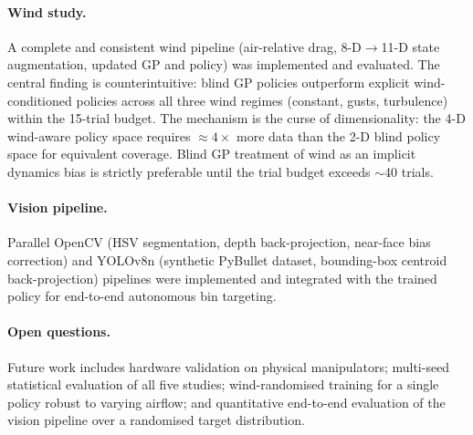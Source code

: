 \paragraph{Wind study.}
A complete and consistent wind pipeline (air-relative drag, 8-D$\to$11-D state
augmentation, updated GP and policy) was implemented and evaluated.
The central finding is counterintuitive: blind GP policies outperform explicit
wind-conditioned policies across all three wind regimes (constant, gusts, turbulence)
within the 15-trial budget.
The mechanism is the curse of dimensionality: the 4-D wind-aware policy space requires
$\approx 4\times$ more data than the 2-D blind policy space for equivalent coverage.
Blind GP treatment of wind as an implicit dynamics bias is strictly preferable until
the trial budget exceeds $\sim$40 trials.

\paragraph{Vision pipeline.}
Parallel OpenCV (HSV segmentation, depth back-projection, near-face bias correction)
and YOLOv8n (synthetic PyBullet dataset, bounding-box centroid back-projection)
pipelines were implemented and integrated with the trained policy for end-to-end
autonomous bin targeting.

\paragraph{Open questions.}
Future work includes hardware validation on physical manipulators; multi-seed
statistical evaluation of all five studies; wind-randomised training for a single
policy robust to varying airflow; and quantitative end-to-end evaluation of the vision
pipeline over a randomised target distribution.
